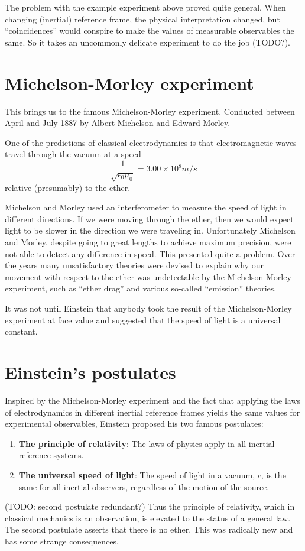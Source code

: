 The problem with the example experiment above proved quite general. When changing (inertial) reference frame, the physical interpretation changed, but ``coincidences'' would conspire to make the values of measurable observables the same. So it takes an uncommonly delicate experiment to do the job (TODO?).

\section{Michelson-Morley experiment}
This brings us to the famous Michelson-Morley experiment. Conducted between April and July 1887 by Albert Michelson and Edward Morley.

One of the predictions of classical electrodynamics is that electromagnetic waves travel through the vacuum at a speed
\[ \frac{1}{\sqrt{\epsilon_0\mu_0}} = 3.00 \times 10^8 \si{m/s} \]
relative (presumably) to the ether.

Michelson and Morley used an interferometer to measure the speed of light in different directions. If we were moving through the ether, then we would expect light to be slower in the direction we were traveling in. Unfortunately Michelson and Morley, despite going to great lengths to achieve maximum precision, were not able to detect any difference in speed. This presented quite a problem. Over the years many unsatisfactory theories were devised to explain why our movement with respect to the ether was undetectable by the Michelson-Morley experiment, such as ``ether drag'' and various so-called ``emission'' theories.

It was not until Einstein that anybody took the result of the Michelson-Morley experiment at face value and suggested that the speed of light is a universal constant.

\section{Einstein's postulates}
Inspired by the Michelson-Morley experiment and the fact that applying the laws of electrodynamics in different inertial reference frames yields the same values for experimental observables, Einstein proposed his two famous postulates:
\begin{enumerate}
\item \textbf{The principle of relativity}: The laws of physics apply in all inertial reference systems.
\item \textbf{The universal speed of light}: The speed of light in a vacuum, $c$, is the same for all inertial observers, regardless of the motion of the source.
\end{enumerate}
(TODO: second postulate redundant?)
Thus the principle of relativity, which in classical mechanics is an observation, is elevated to the status of a general law. The second postulate asserts that there is no ether. This was radically new and has some strange consequences.

